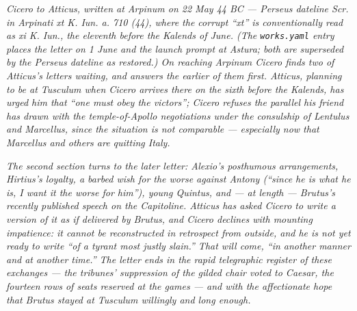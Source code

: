 
\textit{Cicero to Atticus, written at Arpinum on 22 May 44 BC ---
Perseus dateline \textit{Scr. in Arpinati xt K. Iun. a. 710
(44)}, where the corrupt ``xt'' is conventionally read as
\textit{xi K. Iun.}, the eleventh before the Kalends of June.
(The \texttt{works.yaml} entry places the letter on 1 June and
the launch prompt at Astura; both are superseded by the
Perseus dateline as restored.) On reaching Arpinum Cicero finds
two of Atticus's letters waiting, and answers the earlier of
them first. Atticus, planning to be at Tusculum when Cicero
arrives there on the sixth before the Kalends, has urged him
that ``one must obey the victors''; Cicero refuses the
parallel his friend has drawn with the temple-of-Apollo
negotiations under the consulship of Lentulus and Marcellus,
since the situation is not comparable --- especially now that
Marcellus and others are quitting Italy.}

\textit{The second section turns to the later letter: Alexio's
posthumous arrangements, Hirtius's loyalty, a barbed wish for
the worse against Antony (``since he is what he is, I want it
the worse for him''), young Quintus, and --- at length ---
Brutus's recently published speech on the Capitoline. Atticus
has asked Cicero to write a version of it as if delivered by
Brutus, and Cicero declines with mounting impatience: it
cannot be reconstructed in retrospect from outside, and he is
not yet ready to write ``of a tyrant most justly slain.'' That
will come, ``in another manner and at another time.'' The
letter ends in the rapid telegraphic register of these
exchanges --- the tribunes' suppression of the gilded chair
voted to Caesar, the fourteen rows of seats reserved at the
games --- and with the affectionate hope that Brutus stayed at
Tusculum willingly and long enough.}
